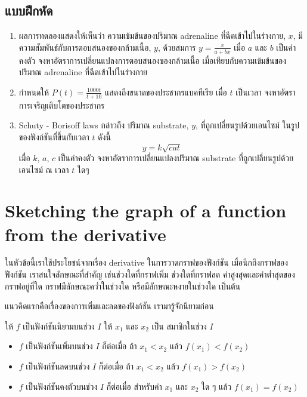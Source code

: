 \documentclass[
]{book}
\begin{document}
\subsection{แบบฝึกหัด}\label{uxe41uxe1auxe1auxe1duxe01uxe2buxe14-3}

\begin{enumerate}
\def\labelenumi{\arabic{enumi}.}
\item
  ผลการทดลองแสดงให้เห็นว่า ความเข้มข้นของปริมาณ adrenaline ที่ฉีดเข้าไปในร่างกาย,
  \(x\), มีความสัมพันธ์กับการตอบสนองของกล้ามเนื้อ, \(y\), ด้วยสมการ
  \(y=\frac{x}{a+bx}\) เมื่อ \(a\) และ \(b\) เป็นค่าคงตัว
  จงหาอัตราการเปลี่ยนแปลงการตอบสนองของกล้ามเนื้อ เมื่อเทียบกับความเข้มข้นของปริมาณ
  adrenaline ที่ฉีดเข้าไปในร่างกาย
\item
  กำหนดให้ \(\displaystyle P(t)=\frac{1000t}{t+10}\)
  แสดงถึงขนาดของประชากรแบคทีเรีย เมื่อ \(t\) เป็นเวลา
  จงหาอัตราการเจริญเติบโตของประชากร
\item
  Schuty - Borisoff laws กล่าวถึง ปริมาณ substrate, \(y\),
  ที่ถูกเปลี่ยนรูปด้วยเอนไซม์ ในรูปของฟังก์ชันที่ขึ้นกับเวลา \(t\) ดังนี้ \[y=k\sqrt{cat}\]
  เมื่อ \(k\), \(a\), \(c\) เป็นค่าคงตัว จงหาอัตราการเปลี่ยนแปลงปริมาณ substrate
  ที่ถูกเปลี่ยนรูปด้วยเอนไซม์ ณ เวลา \(t\) ใดๆ
\end{enumerate}

\section{Sketching the graph of a function from the
derivative}\label{sec-sketch}

ในหัวข้อนี้เราใช้ประโยชน์จากเรื่อง derivative ในการวาดกราฟของฟังก์ชัน
เมื่อนึกถึงกราฟของฟังก์ชัน เราสนใจลักษณะที่สำคัญ เช่นช่วงใดที่กราฟเพิ่ม ช่วงใดที่กราฟลด
ค่าสูงสุดและค่าต่ำสุดของกราฟอยู่ที่ใด กราฟมีลักษณะคว่ำในช่วงใด หรือมีลักษณะหงายในช่วงใด
เป็นต้น

แนวคิดแรกคือเรื่องของการเพิ่มและลดของฟังก์ชัน เรามารู้จักนิยามก่อน

ให้ \(f\) เป็นฟังก์ชันนิยามบนช่วง \(I\) ให้ \(x_1\) และ \(x_2\) เป็น สมาชิกในช่วง
\(I\)

\begin{itemize}
\item
  \(f\) เป็นฟังก์ชันเพิ่มบนช่วง \(I\) ก็ต่อเมื่อ ถ้า \(x_1 < x_2\) แล้ว
  \(f(x_1) < f(x_2)\)
\item
  \(f\) เป็นฟังก์ชันลดบนช่วง \(I\) ก็ต่อเมื่อ ถ้า \(x_1 < x_2\) แล้ว
  \(f(x_1) > f(x_2)\)
\item
  \(f\) เป็นฟังก์ชันคงตัวบนช่วง \(I\) ก็ต่อเมื่อ สำหรับค่า \(x_1\) และ \(x_2\) ใด ๆ
  แล้ว \(f(x_1) = f(x_2)\)
\end{itemize}
\end{document}
